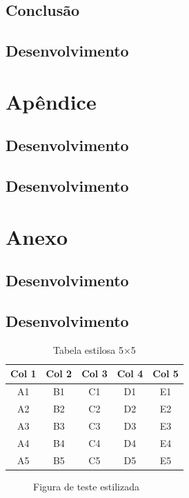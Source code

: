 \documentclass{Arquivos/TrabalhoAcademico}
\begin{document}
\section{Conclusão}
\section{Desenvolvimento}

\postextual %


\printbibliography[heading=none]


\inicioApendices
\chapter{Apêndice}
\section{Desenvolvimento}
\section{Desenvolvimento}

\inicioAnexos
\chapter{Anexo}
\section{Desenvolvimento}
\section{Desenvolvimento}

\begin{table}[ht]
    \centering
    \caption{Tabela estilosa 5×5}
    \label{tab:estilosa}
    \begin{tabular}{ccccc}
        \toprule
        Col 1 & Col 2 & Col 3 & Col 4 & Col 5 \\
        \midrule
        A1 & B1 & C1 & D1 & E1 \\
        A2 & B2 & C2 & D2 & E2 \\
        A3 & B3 & C3 & D3 & E3 \\
        A4 & B4 & C4 & D4 & E4 \\
        A5 & B5 & C5 & D5 & E5 \\
        \bottomrule
    \end{tabular}
\end{table}

\begin{figure}[ht]
    \centering
    \caption{Figura de teste estilizada}
    \label{fig:teste-estilosa}
\end{figure}
\end{document}
